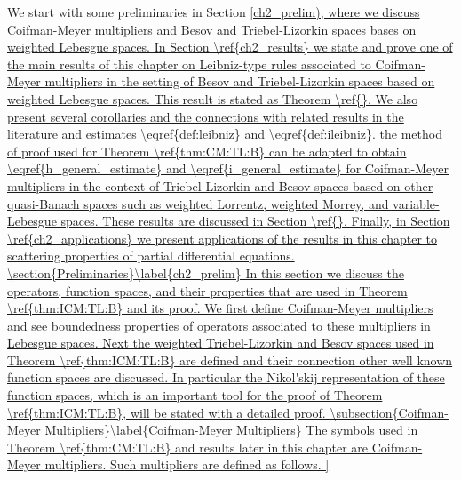 We start with some preliminaries in Section \ref{ch2_prelim), where we discuss Coifman-Meyer multipliers and Besov and Triebel-Lizorkin spaces bases on weighted Lebesgue spaces.

In Section \ref{ch2_results} we state and prove one of the main results of this chapter on Leibniz-type rules associated to Coifman-Meyer multipliers in the setting of Besov and Triebel-Lizorkin spaces based on weighted Lebesgue spaces. This result is stated as Theorem \ref{}. We also present several corollaries and the connections with related results in the literature and estimates \eqref{def:leibniz} and \eqref{def:ileibniz}. the method of proof used for Theorem \ref{thm:CM:TL:B} can be adapted to obtain \eqref{h_general_estimate} and \eqref{i_general_estimate} for Coifman-Meyer multipliers in the context of Triebel-Lizorkin and Besov spaces based on other quasi-Banach spaces such as weighted Lorrentz, weighted Morrey, and variable-Lebesgue spaces. These results are discussed in Section \ref{}.

Finally, in Section \ref{ch2_applications} we present applications of the results in this chapter to scattering properties of partial differential equations. 

\section{Preliminaries}\label{ch2_prelim}
In this section we discuss the operators, function spaces, and their properties that are used in Theorem \ref{thm:ICM:TL:B} and its proof. We first define Coifman-Meyer multipliers and see boundedness properties of operators associated to these multipliers in Lebesgue spaces. Next the weighted Triebel-Lizorkin and Besov spaces used in Theorem \ref{thm:ICM:TL:B} are defined and their connection other well known function spaces are discussed. In particular the Nikol'skij representation of these function spaces, which is an important tool for the proof of Theorem \ref{thm:ICM:TL:B}, will be stated with a detailed proof.
\subsection{Coifman-Meyer Multipliers}\label{Coifman-Meyer Multipliers}

The symbols used in Theorem \ref{thm:CM:TL:B} and results later in this chapter are Coifman-Meyer multipliers. Such multipliers are defined as follows.

}
